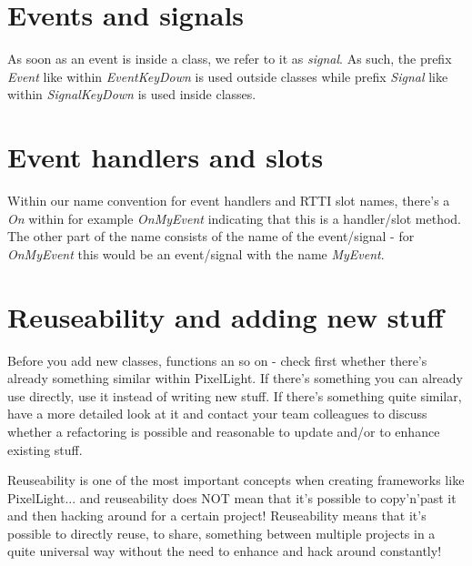 \section{Events and signals}
As soon as an event is inside a class, we refer to it as \emph{signal}. As such, the prefix \emph{Event} like within \emph{EventKeyDown} is used outside classes while prefix \emph{Signal} like within \emph{SignalKeyDown} is used inside classes.




\section{Event handlers and slots}
Within our name convention for event handlers and RTTI slot names, there's a \emph{On} within for example \emph{OnMyEvent} indicating that this is a handler/slot method. The other part of the name consists of the name of the event/signal - for \emph{OnMyEvent} this would be an event/signal with the name \emph{MyEvent}.




\section{Reuseability and adding new stuff}
Before you add new classes, functions an so on - check first whether there's already something similar within PixelLight. If there's something you can already use directly, use it instead of writing new stuff. If there's something quite similar, have a more detailed look at it and contact your team colleagues to discuss whether a refactoring is possible and reasonable to update and/or to enhance existing stuff.

Reuseability is one of the most important concepts when creating frameworks like PixelLight... and reuseability does NOT mean that it's possible to copy'n'past it and then hacking around for a certain project! Reuseability means that it's possible to directly reuse, to share, something between multiple projects in a quite universal way without the need to enhance and hack around constantly!
